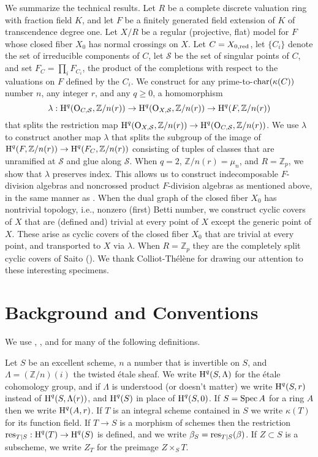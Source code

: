 \documentclass{amsart}
\theoremstyle{plain}
\theoremstyle{definition}
\theoremstyle{remark}
\numberwithin{equation}{section}%
\renewcommand{\H}{{\text{\rm H}}}
\renewcommand{\O}{{\text{\rm O}}}
\renewcommand{\S}{{\mathcal S}}
\newcommand{\Z}{{\mathbb Z}}
\newcommand{\car}{{\text{\rm char}}}
\newcommand{\red}{{\text{\rm red}}}
\newcommand{\res}{{\text{\rm res}}}
\newcommand{\Spec}{{\text{\rm Spec}\,}}
\begin{document}
We summarize the technical results.
Let $R$ be a complete discrete valuation ring with fraction field $K$,
and let $F$ be a finitely generated field extension of $K$ of transcendence degree one.
Let $X/R$ be a regular (projective, flat) model for $F$
whose closed fiber $X_0$ has normal crossings on $X$.
Let $C=X_{0,\red}$, let $\{C_i\}$ denote the set of irreducible components of $C$,
let $\S$ be the set of singular points of $C$, 
and set $F_C=\prod_i F_{C_i}$, the product of
the completions with respect to the valuations on $F$ defined by the $C_i$.
We construct for any prime-to-$\car(\kappa(C))$ number $n$, 
any integer $r$, and any $q\geq 0$, a homomorphism
$$
\lambda:\H^q(\O_{C,\S},\Z/n(r))\to\H^q(\O_{X,\S},\Z/n(r))\to\H^q(F,\Z/n(r))
$$
that splits the restriction map $\H^q(\O_{X,\S},\Z/n(r))\to\H^q(\O_{C,\S},\Z/n(r))$.
We use $\lambda$ to construct another map $\lambda$ that splits the subgroup
of the image of $\H^q(F,\Z/n(r))\to\H^q(F_C,\Z/n(r))$
consisting of tuples of classes that are unramified at $\S$ and glue along $\S$.
When $q=2$, $\Z/n(r)=\mu_n$, and $R=\Z_p$, we show that $\lambda$ preserves index.
This allows us to construct indecomposable
$F$-division algebras and noncrossed product $F$-division algebras as mentioned above,
in the same manner as \cite{BMT}.
When the dual graph of the closed fiber $X_0$ has nontrivial topology, i.e., 
nonzero (first) Betti number, we construct cyclic covers of $X$
that are (defined and) trivial at every point of $X$ except the generic point of $X$.
These arise as cyclic covers of the closed fiber $X_0$ that are trivial at every point, and transported
to $X$ via $\lambda$.
When $R=\Z_p$ they are the completely split cyclic covers of 
Saito (\cite{Sai85}).
We thank Colliot-Th\'el\`ene for drawing our attention to these interesting specimens.

\section{Background and Conventions}

We use \cite[Chapter 8,9]{Liu},
\cite[Section 2]{GM}, and \cite[Chapter XIII]{SGA1} for many of the following definitions.

Let $S$ be an excellent scheme, $n$ a number that is invertible on $S$,
and $\Lambda=(\Z/n)(i)$ the twisted \'etale sheaf.
We write $\H^q(S,\Lambda)$ for the \'etale cohomology group,
and if $\Lambda$ is understood (or doesn't matter)
we write $\H^q(S,r)$ instead of $\H^q(S,\Lambda(r))$,
and $\H^q(S)$ in place of $\H^q(S,0)$.
If $S=\Spec A$ for a ring $A$ then we 
write $\H^q(A,r)$.
If $T$ is an integral scheme contained in $S$ we write $\kappa(T)$ for its function field. 
If $T\to S$ is a morphism of schemes then
the restriction $\res_{T|S}:\H^q(T)\to\H^q(S)$ is defined,
and we write $\beta_S=\res_{T|S}(\beta)$.  
If $Z\subset S$ is a subscheme, we write $Z_T$ for the preimage $Z\times_S T$.
\end{document}
